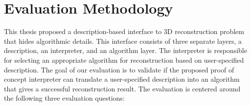 
\section{Evaluation Methodology}
\label{sec:interp_eval_methodology}

This thesis proposed a description-based interface to 3D reconstruction problem that hides algorithmic details. This interface consists of three separate layers, a description, an interpreter, and an algorithm layer. The interpreter is responsible for selecting an appropriate algorithm for reconstruction based on user-specified description. The goal of our evaluation is to validate if the proposed proof of concept interpreter can translate a user-specified description into an algorithm that gives a successful reconstruction result. The evaluation is centered around the following three evaluation questions:



